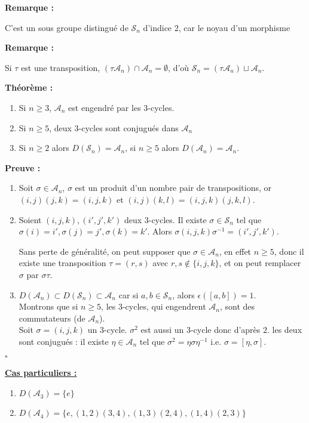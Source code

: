 \documentclass{report}
\renewenvironment{leftbar}{%
  \def\FrameCommand{\vrule width 0.4pt \hspace{10pt}}%
  \MakeFramed {\advance\hsize-\width \FrameRestore}}%
 {\endMakeFramed}%
\newenvironment{preuve}{\vspace*{0.5cm}
    \begin{leftbar}
    \noindent\textbf{Preuve :}\par}{
    \begin{flushright}
    $\square$
    \end{flushright}
    \end{leftbar}
}
\newenvironment{theoreme}[1][]{
    \begin{tcolorbox}[]
    \textbf{Théorème :} #1  \par} 
    {\end{tcolorbox}}
\newcommand{\remarque}{
    \noindent\textbf{Remarque :} \par
}
\newcommand{\sn}{\mathcal{S}_{n}}
\newcommand{\an}{\mathcal{A}_{n}}
\begin{document}
\remarque{C'est un sous groupe distingué de $\sn$ d'indice 2, car le noyau d'un morphisme}


\remarque{Si $\tau$ est une transposition, $(\tau\an)\cap\an=\emptyset$, d'où $\sn=(\tau\an)\sqcup\an$.}
\begin{theoreme}
\begin{enumerate}
\item Si $n\geq3$, $\an$ est engendré par les 3-cycles.
\item Si $n\geq5$, deux 3-cycles sont conjugués dans $\an$ 
\item Si $n\geq2$ alors $D(\sn)=\an$, si $n\geq5$ alors $D(\an)=\an$.
\end{enumerate}
\end{theoreme}

\begin{preuve}
\begin{enumerate}
\item Soit $\sigma\in\an$, $\sigma$ est un produit d'un nombre pair de transpositions, or $(i,j)(j,k)=(i,j,k)$ et $(i,j)(k,l)=(i,j,k)(j,k,l)$.
\item Soient $(i,j,k),(i',j',k')$ deux 3-cycles. Il existe $\sigma\in\sn$ tel que $\sigma(i)=i', \sigma(j)=j', \sigma(k)=k'$. Alors $\sigma(i,j,k)\sigma^{-1}=(i',j',k')$. \par Sans perte de généralité, on peut supposer que $\sigma\in\an$, en effet $n\geq5$, donc il existe une transposition $\tau=(r,s)$ avec $r,s\notin\{i,j,k\}$, et on peut remplacer $\sigma$ par $\sigma\tau$.
\item $D(\an)\subset D(\sn)\subset\an$ car si $a,b\in\sn$, alors $\epsilon([a,b])=1$.\\
Montrons que si $n\geq5$, les 3-cycles, qui engendrent $\an$, sont des commutateurs (de $\an$).\\
Soit $\sigma=(i,j,k)$ un 3-cycle. $\sigma^2$ est aussi un 3-cycle donc d'après $2.$ les deux sont conjugués : il existe $\eta\in\an$ tel que $\sigma^2=\eta\sigma\eta^{-1}$ i.e. $\sigma=[\eta,\sigma]$.
\end{enumerate}
\end{preuve}

\noindent\underline{\textbf{Cas particuliers :}}
\begin{enumerate}
\item $D(\mathcal{A}_3)=\{e\}$
\item $D(\mathcal{A}_4)=\{e,(1,2)(3,4),(1,3)(2,4),(1,4)(2,3)\}$
\end{enumerate}
\end{document}
